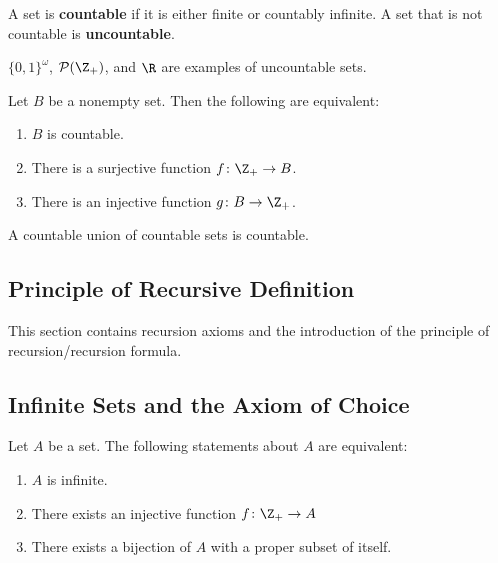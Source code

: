 \begin{definition}
A set is \textbf{countable} if it is either finite or countably infinite. A set that is not countable is \textbf{uncountable}.
\end{definition}

\begin{eg}
$\{0, 1\}^\omega$, $\mathcal{P} (\Z_+)$, and $\R$ are examples of uncountable sets.
\end{eg}

\begin{theorem}
Let $B$ be a nonempty set. Then the following are equivalent:
\begin{enumerate}
    \item $B$ is countable.
    \item There is a surjective function $f\colon \Z_+ \rightarrow B$.
    \item There is an injective function $g\colon B \rightarrow \Z_+$.
\end{enumerate}    
\end{theorem}

\begin{theorem}
A countable union of countable sets is countable.
\end{theorem}

\subsection{Principle of Recursive Definition}
This section contains recursion axioms and the introduction of the principle of recursion/recursion formula.  

\subsection{Infinite Sets and the Axiom of Choice}

\begin{theorem}
Let $A$ be a set. The following statements about $A$ are equivalent:
\begin{enumerate}
    \item $A$ is infinite.
    \item There exists an injective function $f \colon \Z_+ \rightarrow A$
    \item There exists a bijection of $A$ with a proper subset of itself.
\end{enumerate}
\end{theorem}

